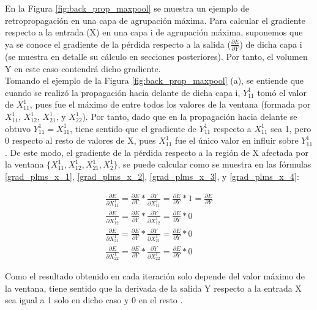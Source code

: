 En la Figura \ref{fig:back_prop_maxpool} se muestra un ejemplo de retropropagación en una capa de agrupación máxima. Para calcular el gradiente respecto a la entrada (X) en una capa i de agrupación máxima, suponemos que ya se conoce el gradiente de la pérdida respecto a la salida ($\frac{\partial E}{\partial Y}$) de dicha capa i (se muestra en detalle su cálculo en secciones posteriores). Por tanto, el volumen Y en este caso contendrá dicho gradiente. \\ 
Tomando el ejemplo de la Figura \ref{fig:back_prop_maxpool} (a), se entiende que cuando se realizó la propagación hacia delante de dicha capa i, $Y^1_{11}$ tomó el valor de $X^1_{11}$, pues fue el máximo de entre todos los valores de la ventana (formada por $X^1_{11}$, $X^1_{12}$, $X^1_{21}$, y $X^1_{22}$). Por tanto, dado que en la propagación hacia delante se obtuvo $Y^1_{11} = X^1_{11}$, tiene sentido que el gradiente de $Y^1_{11}$ respecto a $X^1_{11}$ sea 1, pero 0 respecto al resto de valores de X, pues $X^1_{11}$ fue el único valor en influir sobre $Y^1_{11}$. De este modo, el gradiente de la pérdida respecto a la región de X afectada por la ventana $\{X^1_{11}, X^1_{12}, X^1_{21}, X^1_{2} \}$, se puede calcular como se muestra en las fórmulas \ref{grad_plms_x_1}, \ref{grad_plms_x_2}, \ref{grad_plms_x_3}, y \ref{grad_plms_x_4}:

\begin{gather}
	\frac{\partial E}{\partial X^1_{11}} = \frac{\partial E}{\partial Y} * \frac{\partial Y}{\partial X^1_{11}} = \frac{\partial E}{\partial Y} * 1 = \frac{\partial E}{\partial Y} \label{grad_plms_x_1} \\
	\frac{\partial E}{\partial X^1_{12}} = \frac{\partial E}{\partial Y} * \frac{\partial Y}{\partial X^1_{12}} = \frac{\partial E}{\partial Y} * 0 \label{grad_plms_x_2} \\
	\frac{\partial E}{\partial X^1_{21}} = \frac{\partial E}{\partial Y} * \frac{\partial Y}{\partial X^1_{21}} = \frac{\partial E}{\partial Y} * 0 \label{grad_plms_x_3} \\
	\frac{\partial E}{\partial X^1_{22}} = \frac{\partial E}{\partial Y} * \frac{\partial Y}{\partial X^1_{22}} = \frac{\partial E}{\partial Y} * 0 \label{grad_plms_x_4}
\end{gather}


 
Como el resultado obtenido en cada iteración solo depende del valor máximo de la ventana, tiene sentido que la derivada de la salida Y respecto a la entrada X sea igual a 1 solo en dicho caso y 0 en el resto \cite{max_pool_backprop} \cite{max_pool_backprop_2}.
